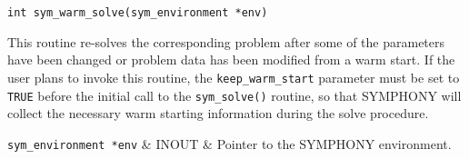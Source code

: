 
\begin{verbatim}
int sym_warm_solve(sym_environment *env)
\end{verbatim}

\bd
\describe

This routine re-solves the corresponding problem after some of the parameters
have been changed or problem data has been modified from a warm start.  If the
user plans to invoke this routine, the \texttt{keep\_warm\_start} parameter
must be set to \texttt{TRUE} before the initial call to the {\tt sym\_solve()}
routine, so that SYMPHONY will collect the necessary warm starting information
during the solve procedure.

\args

{\tt sym\_environment *env} & INOUT & Pointer to the SYMPHONY environment.
\et

\returns

